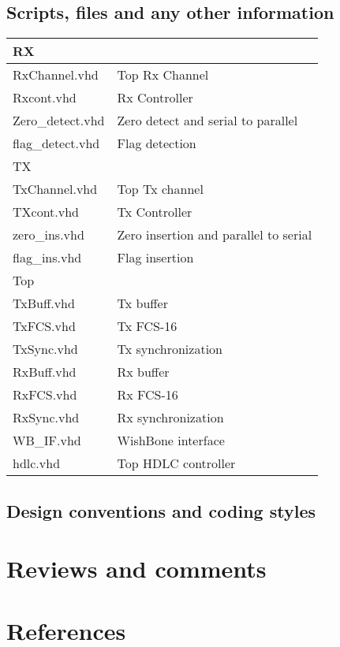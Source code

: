 \documentclass[a4paper,11pt]{article}
\begin{document}
\subsection{Scripts, files and any other information}
\begin{tabular}{|l|l|}
\hline
RX & \\
\hline
RxChannel.vhd & Top Rx Channel \\
Rxcont.vhd & Rx Controller \\
Zero\_detect.vhd & Zero detect and serial to parallel \\
flag\_detect.vhd & Flag detection \\
\hline
TX & \\
\hline
TxChannel.vhd & Top Tx channel \\
TXcont.vhd & Tx Controller\\
zero\_ins.vhd  & Zero insertion and parallel to serial \\
flag\_ins.vhd & Flag insertion \\
\hline
Top & \\
\hline
TxBuff.vhd&  Tx buffer\\
TxFCS.vhd &  Tx FCS-16\\
TxSync.vhd & Tx synchronization\\
RxBuff.vhd&  Rx buffer\\
RxFCS.vhd &  Rx FCS-16\\
RxSync.vhd & Rx synchronization\\
WB\_IF.vhd & WishBone interface\\
hdlc.vhd  & Top HDLC controller\\
\hline
\end{tabular}
 
 
 
 
\subsection{Design conventions and coding styles}
 
\section{Reviews and comments}
 
\section{References}
 
 
\end{document}
